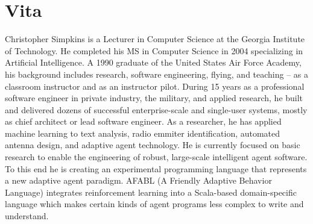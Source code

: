 \chapter*{Vita}


Christopher Simpkins is a Lecturer in Computer Science at the Georgia Institute of Technology. He completed his MS in Computer Science in 2004 specializing in Artificial Intelligence. A 1990 graduate of the United States Air Force Academy, his background includes research, software engineering, flying, and teaching -- as a classroom instructor and as an instructor pilot. During 15 years as a professional software engineer in private industry, the military, and applied research, he built and delivered dozens of successful enterprise-scale and single-user systems, mostly as chief architect or lead software engineer. As a researcher, he has applied machine learning to text analysis, radio emmiter identification, automated antenna design, and adaptive agent technology. He is currently focused on basic research to enable the engineering of robust, large-scale intelligent agent software. To this end he is creating an experimental programming language that represents a new adaptive agent paradigm. AFABL (A Friendly Adaptive Behavior Language) integrates reinforcement learning into a Scala-based domain-specific language which makes certain kinds of agent programs less complex to write and understand.
